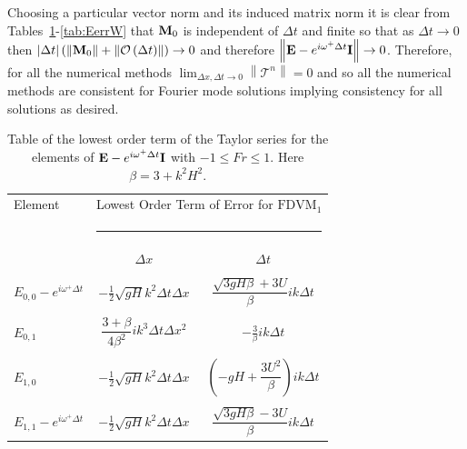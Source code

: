 Choosing a particular vector norm and its induced matrix norm it is clear from Tables~\ref{tab:EerrFDVM1}-\ref{tab:EerrW} that $\mathbf{M}_0$ is independent of $\Delta t$ and finite so that as $\Delta t \rightarrow 0$ then $|\Delta t| \left(\left \| \mathbf{M}_0 \right \| + \left \| \mathcal{O}\left(\Delta t\right)\right \|\right)  \rightarrow 0$  and therefore  $\left \| \mathbf{E} -  e^{i \omega^+ \Delta t}\mathbf{I} \right \| \rightarrow 0$. Therefore, for all the numerical methods $ \lim_{\Delta x,\Delta t \rightarrow 0}\left \| \mathcal{T}^n \right \| = 0 $ and so all the numerical methods are consistent for Fourier mode solutions implying consistency for all solutions as desired. 

\begin{table}
	\begin{tabular}{l  c c}
	\hline
		Element & \multicolumn{2}{c}{Lowest Order Term of Error for $\text{FDVM}_1$}\\
		&  \multicolumn{2}{l}{\rule{0.7\textwidth}{0.4pt}} \\
		& $\Delta x$&$\Delta t$\\
		\hline && \\
		$E_{0,0} -  e^{i \omega^+ \Delta t} $& $ - \frac{1}{2} \sqrt{gH} k^2 \Delta t\Delta x$ & $\dfrac{\sqrt{3gH \beta} + 3U}{\beta} ik \Delta t$ \\ & & \\
		$E_{0,1}$& $ \dfrac{3 + \beta}{4 \beta^2}i k^3\Delta  t\Delta x^2$ &  $ - \frac{3}{\beta} ik\Delta t$ \\ & & \\
		$E_{1,0}$& $ - \frac{1}{2} \sqrt{gH} k^2 \Delta t\Delta x$ &  $ \left(-gH + \dfrac{3U^2}{\beta}\right)ik \Delta t$ \\ & & \\
		$E_{1,1} -  e^{i \omega^+ \Delta t}$& $ - \frac{1}{2} \sqrt{gH} k^2 \Delta t\Delta x$ & $\dfrac{\sqrt{3gH \beta} - 3U}{\beta} ik \Delta t$ \\ 
		\hline
	\end{tabular}
	\caption{Table of the lowest order term of the Taylor series for the elements of $\mathbf{E} - e^{i \omega^+ \Delta t} \mathbf{I}$ with $ -1 \le Fr \le 1$. Here $\beta = 3 + k^2 H^2$.}
	\label{tab:EerrFDVM1} 
\end{table}

